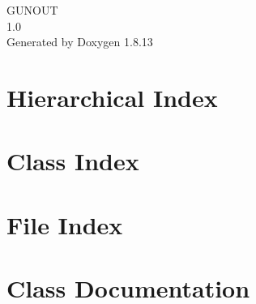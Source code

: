 \documentclass[twoside]{book}
\newcommand{\+}{\discretionary{\mbox{\scriptsize$\hookleftarrow$}}{}{}}
\newcommand{\clearemptydoublepage}{%
  \newpage{\pagestyle{empty}\cleardoublepage}%
}
\begin{document}
\hypersetup{pageanchor=false,
             bookmarksnumbered=true,
             pdfencoding=unicode
            }
\begin{titlepage}
\vspace*{7cm}
\begin{center}%
{\Large G\+U\+N\+O\+UT \\[1ex]\large 1.\+0 }\\
\vspace*{1cm}
{\large Generated by Doxygen 1.8.13}\\
\end{center}
\end{titlepage}
\clearemptydoublepage
{}
\tableofcontents
\clearemptydoublepage
{}
\hypersetup{pageanchor=true}

\chapter{Hierarchical Index}

\chapter{Class Index}

\chapter{File Index}

\chapter{Class Documentation}





































\end{document}
